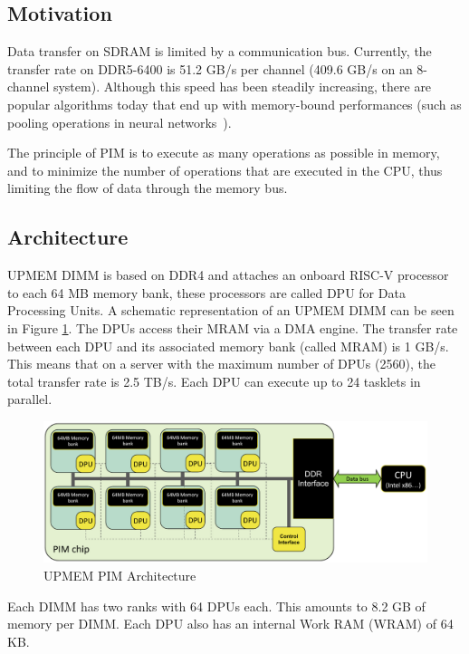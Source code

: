 \subsection{Motivation}

Data transfer on SDRAM is limited by a communication bus. Currently, the transfer rate on DDR5-6400 is 51.2 GB/s per channel (409.6 GB/s on an 8-channel system). Although this speed has been steadily increasing, there are popular algorithms today that end up with memory-bound performances (such as pooling operations in neural networks~\cite{nvidia.memory2020}).

The principle of PIM is to execute as many operations as possible in memory, and to minimize the number of operations that are executed in the CPU, thus limiting the flow of data through the memory bus.

\subsection{Architecture}

UPMEM DIMM is based on DDR4 and attaches an onboard RISC-V processor to each 64 MB memory bank, these processors are called DPU for Data Processing Units. A schematic representation of an UPMEM DIMM can be seen in Figure \ref{fig:DIMM}. The DPUs access their MRAM via a DMA engine. The transfer rate between each DPU and its associated memory bank (called MRAM) is 1 GB/s. This means that on a server with the maximum number of DPUs (2560), the total transfer rate is 2.5 TB/s. Each DPU can execute up to 24 tasklets in parallel.

\begin{figure}[htb]
    \centering
    \includegraphics[width=0.95\linewidth]{figures/PIM.pdf}
    \caption{\label{fig:DIMM}UPMEM PIM Architecture}
\end{figure}

Each DIMM has two ranks with 64 DPUs each. This amounts to 8.2 GB of memory per DIMM. Each DPU also has an internal Work RAM (WRAM) of 64 KB.

